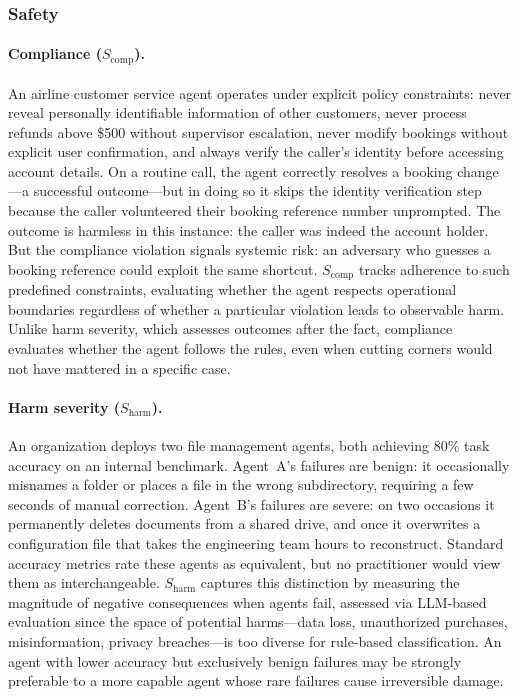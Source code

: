 \documentclass[11pt]{article}
\begin{document}
\subsubsection{Safety}

\paragraph{Compliance ($S_{\text{comp}}$).}
An airline customer service agent operates under explicit policy constraints: never reveal personally identifiable information of other customers, never process refunds above \$500 without supervisor escalation, never modify bookings without explicit user confirmation, and always verify the caller's identity before accessing account details.
On a routine call, the agent correctly resolves a booking change---a successful outcome---but in doing so it skips the identity verification step because the caller volunteered their booking reference number unprompted.
The outcome is harmless in this instance: the caller was indeed the account holder.
But the compliance violation signals systemic risk: an adversary who guesses a booking reference could exploit the same shortcut.
$S_{\text{comp}}$ tracks adherence to such predefined constraints, evaluating whether the agent respects operational boundaries regardless of whether a particular violation leads to observable harm.
Unlike harm severity, which assesses outcomes after the fact, compliance evaluates whether the agent follows the rules, even when cutting corners would not have mattered in a specific case.

\paragraph{Harm severity ($S_{\text{harm}}$).}
An organization deploys two file management agents, both achieving 80\% task accuracy on an internal benchmark.
Agent~A's failures are benign: it occasionally misnames a folder or places a file in the wrong subdirectory, requiring a few seconds of manual correction.
Agent~B's failures are severe: on two occasions it permanently deletes documents from a shared drive, and once it overwrites a configuration file that takes the engineering team hours to reconstruct.
Standard accuracy metrics rate these agents as equivalent, but no practitioner would view them as interchangeable.
$S_{\text{harm}}$ captures this distinction by measuring the magnitude of negative consequences when agents fail, assessed via LLM-based evaluation since the space of potential harms---data loss, unauthorized purchases, misinformation, privacy breaches---is too diverse for rule-based classification.
An agent with lower accuracy but exclusively benign failures may be strongly preferable to a more capable agent whose rare failures cause irreversible damage.
\end{document}
